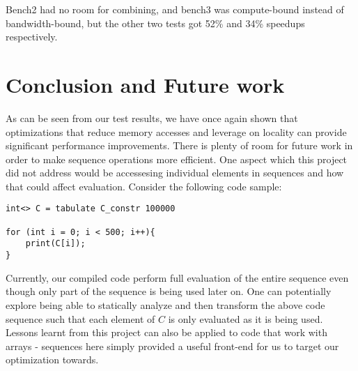 \documentclass[a4paper,twocolumn]{article}
\begin{document}
\noindent
Bench2 had no room for combining, and bench3 was compute-bound instead of
bandwidth-bound, but the other two tests got 52\% and 34\% speedups respectively.

\section{Conclusion and Future work}
As can be seen from our test results, we have once again shown that
optimizations that reduce memory accesses and leverage on locality can provide
significant performance improvements. There is plenty of room for future work
in order to make sequence operations more efficient. One aspect which this
project did not address would be accessesing individual elements in sequences
and how that could affect evaluation. Consider the following code sample:
\begin{verbatim}
int<> C = tabulate C_constr 100000

for (int i = 0; i < 500; i++){
    print(C[i]);
}
\end{verbatim}
Currently, our compiled code perform full evaluation of the entire sequence
even though only part of the sequence is being used later on. One can
potentially explore being able to statically analyze and then transform the
above code sequence such that each element of $C$ is only evaluated as it is
being used. Lessons learnt from this project can also be applied to code that
work with arrays - sequences here simply provided a useful front-end for us to
target our optimization towards.
\end{document}
